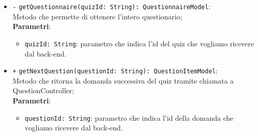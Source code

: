 \begin{itemize}
\begin{itemize}
\begin{itemize}
		\end{itemize}
		\item \texttt{-} \texttt{getQuestionnaire(quizId: String): QuestionnaireModel}: \\ Metodo che permette di ottenere l'intero questionario; \\
		\textbf{Parametri}:
		\begin{itemize}
			\item \texttt{quizId: String}: parametro che indica l'id del quiz che vogliamo ricevere dal back-end.
		\end{itemize}
		\item \texttt{+} \texttt{getNextQuestion(questionId: String): QuestionItemModel}: \\ Metodo che ritorna la domanda successiva del quiz tramite chiamata a QuestionController; \\
		\textbf{Parametri}:
		\begin{itemize}
			\item \texttt{questionId: String}: parametro che indica l'id della domanda che vogliamo ricevere dal back-end.
		\end{itemize}
	\end{itemize}
\end{itemize}

